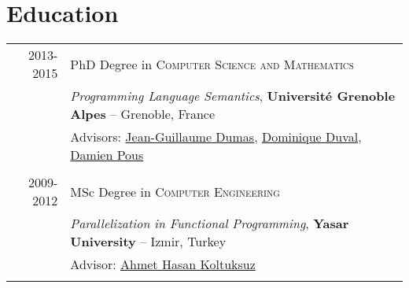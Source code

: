 \documentclass[a4paper,9pt]{article} %
\begin{document}
\section{Education}

\begin{tabular}{rl}	


2013-2015& PhD Degree in \textsc{}\textsc{Computer Science and Mathematics}\\%
& \small\emph{Programming Language Semantics}, \normalsize\textbf{Université Grenoble Alpes} -- Grenoble, France\\
& Advisors: \href{https://membres-ljk.imag.fr/Jean-Guillaume.Dumas/}{Jean-Guillaume Dumas},
\href{https://membres-ljk.imag.fr/Dominique.Duval/}{Dominique Duval}, 
\href{https://perso.ens-lyon.fr/damien.pous/}{Damien Pous}\\
&\\



2009-2012& MSc Degree in \textsc{}\textsc{Computer Engineering}\\%
& \small\emph{Parallelization in Functional Programming}, \normalsize\textbf{Yasar University} -- Izmir, Turkey\\
& Advisor: \href{https://staff.yasar.edu.tr/Create/Cv/VDBSVmVWUkhaM3BOYTA1Ml$xwUkJlazFVWnpB45$xYSR/tr}{Ahmet Hasan Koltuksuz}
\\ \\


\end{tabular}
\end{document}
